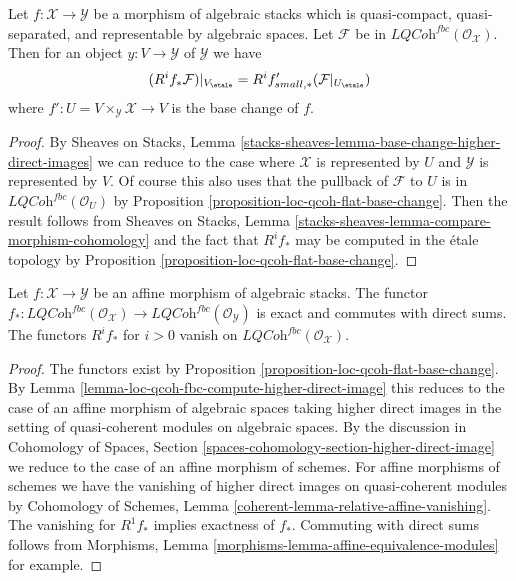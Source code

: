 \begin{lemma}
\label{lemma-loc-qcoh-fbc-compute-higher-direct-image}
Let $f : \mathcal{X} \to \mathcal{Y}$ be a morphism of algebraic stacks
which is quasi-compact, quasi-separated, and
representable by algebraic spaces. Let $\mathcal{F}$ be in
$\textit{LQCoh}^{fbc}(\mathcal{O}_\mathcal{X})$.
Then for an object $y : V \to \mathcal{Y}$ of $\mathcal{Y}$ we have
$$
(R^if_*\mathcal{F})|_{V_\etale} = R^if'_{small, *}(\mathcal{F}|_{U_\etale})
$$
where $f' : U = V \times_\mathcal{Y} \mathcal{X} \to V$ is the base
change of $f$.
\end{lemma}

\begin{proof}
By Sheaves on Stacks, Lemma
\ref{stacks-sheaves-lemma-base-change-higher-direct-images}
we can reduce to the case where $\mathcal{X}$
is represented by $U$ and $\mathcal{Y}$ is
represented by $V$. Of course this also uses that the pullback of
$\mathcal{F}$ to $U$ is in $\textit{LQCoh}^{fbc}(\mathcal{O}_U)$
by Proposition \ref{proposition-loc-qcoh-flat-base-change}.
Then the result follows from
Sheaves on Stacks, Lemma
\ref{stacks-sheaves-lemma-compare-morphism-cohomology}
and the fact that $R^if_*$ may be computed in the
\'etale topology by
Proposition \ref{proposition-loc-qcoh-flat-base-change}.
\end{proof}

\begin{lemma}
\label{lemma-loc-qcoh-fbc-affine-direct-image}
Let $f : \mathcal{X} \to \mathcal{Y}$ be an affine morphism of algebraic
stacks. The functor $f_* : \textit{LQCoh}^{fbc}(\mathcal{O}_\mathcal{X}) \to
\textit{LQCoh}^{fbc}(\mathcal{O}_\mathcal{Y})$ is exact and commutes
with direct sums. The functors $R^if_*$ for $i > 0$ vanish on
$\textit{LQCoh}^{fbc}(\mathcal{O}_\mathcal{X})$.
\end{lemma}

\begin{proof}
The functors exist by Proposition \ref{proposition-loc-qcoh-flat-base-change}.
By Lemma \ref{lemma-loc-qcoh-fbc-compute-higher-direct-image}
this reduces to the case of an affine morphism of algebraic spaces
taking higher direct images in the setting of quasi-coherent
modules on algebraic spaces. By the discussion in
Cohomology of Spaces, Section
\ref{spaces-cohomology-section-higher-direct-image}
we reduce to the case of an affine morphism of schemes.
For affine morphisms of schemes we have the vanishing of
higher direct images on quasi-coherent modules by
Cohomology of Schemes, Lemma \ref{coherent-lemma-relative-affine-vanishing}.
The vanishing for $R^1f_*$ implies exactness of $f_*$.
Commuting with direct sums follows from
Morphisms, Lemma \ref{morphisms-lemma-affine-equivalence-modules}
for example.
\end{proof}










